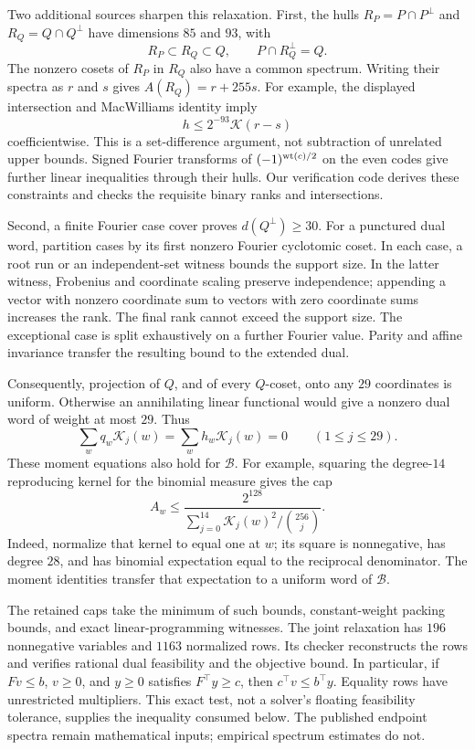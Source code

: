 Two additional sources sharpen this relaxation.
First, the hulls $R_P=P\cap P^\perp$ and $R_Q=Q\cap Q^\perp$ have dimensions
$85$ and $93$, with
\[
 R_P\subset R_Q\subset Q,\qquad P\cap R_Q^\perp=Q.
\]
The nonzero cosets of $R_P$ in $R_Q$ also have a common spectrum.
Writing their spectra as $r$ and $s$ gives $A(R_Q)=r+255s$.
For example, the displayed intersection and MacWilliams identity imply
\[
 h\le 2^{-93}\mathcal K(r-s)
\]
coefficientwise. This is a set-difference argument, not subtraction of
unrelated upper bounds. Signed Fourier transforms of
$(-1)^{\operatorname{wt}(c)/2}$ on the even codes give further linear inequalities through
their hulls. Our verification code derives these constraints and checks the requisite
binary ranks and intersections.

Second, a finite Fourier case cover proves $d(Q^\perp)\ge30$.
For a punctured dual word, partition cases by its first nonzero Fourier
cyclotomic coset. In each case, a root run or an independent-set witness
bounds the support size. In the latter witness, Frobenius and coordinate
scaling preserve independence; appending a vector with nonzero coordinate
sum to vectors with zero coordinate sums increases the rank. The final
rank cannot exceed the support size. The exceptional case is split
exhaustively on a further Fourier value. Parity and affine invariance
transfer the resulting bound to the extended dual.

Consequently, projection of $Q$, and of every $Q$-coset, onto any $29$
coordinates is uniform. Otherwise an annihilating linear functional would
give a nonzero dual word of weight at most $29$.
Thus
\[
 \sum_w q_w\mathcal K_j(w)=\sum_w h_w\mathcal K_j(w)=0
 \qquad(1\le j\le29).
\]
These moment equations also hold for $\mathcal B$.
For example, squaring the degree-$14$ reproducing kernel for the binomial
measure gives the cap
\begin{equation}
 A_w\le
 \frac{2^{128}}{\displaystyle\sum_{j=0}^{14}
             \mathcal K_j(w)^2/\binom{256}{j}}.
 \label{eq:finite-christoffel-cap}
\end{equation}
Indeed, normalize that kernel to equal one at $w$; its square is
nonnegative, has degree $28$, and has binomial expectation equal to the
reciprocal denominator. The moment identities transfer that expectation to
a uniform word of $\mathcal B$.

The retained caps take the minimum of such bounds, constant-weight packing
bounds, and exact linear-programming witnesses. The joint relaxation has
$196$ nonnegative variables and $1163$ normalized rows.
Its checker reconstructs the rows and verifies rational dual feasibility
and the objective bound. In particular, if $Fv\le b$, $v\ge0$, and
$y\ge0$ satisfies $F^\top y\ge c$, then $c^\top v\le b^\top y$.
Equality rows have unrestricted multipliers. This exact test, not a solver's
floating feasibility tolerance, supplies the inequality consumed below.
The published endpoint spectra remain mathematical inputs; empirical
spectrum estimates do not.

